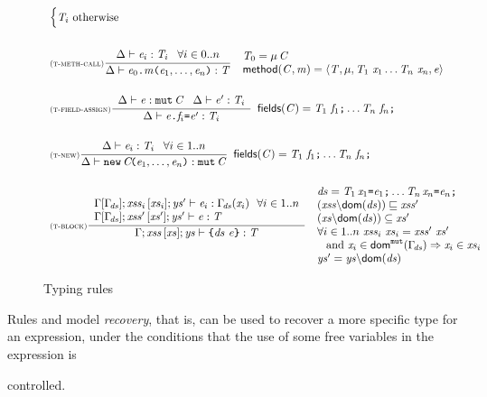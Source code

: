 {\begin{figure}[ht!]
{\begin{footnotesize}
\begin{math}
\begin{array}{l}
{{\begin{cases}
\T_i\ \mbox{otherwise}
\end{cases}
}}
\\[5ex]
\NamedRule{t-meth-call}{\TypeCheckShort{\Delta}{\e_i}{\T_i}\Space\forall i\in 0..n}{\TypeCheckShort{\Delta}{\MethCall{\e_0}{\m}{\e_1,\ldots,\e_n}}{\T}}{
\begin{array}{l}
\T_0=\Type\mu\C\\
\method{\C}{\m}=\FourTuple{\T}{\mu}{\Param{\T_1}{\x_1}\ldots\Param{\T_n}{\x_n}}{\e}
\end{array}
}
\\[5ex]
\NamedRule{t-field-assign}{
  \TypeCheckShort{\Delta}{\e}{\Type{\mutable}{\C}}
  \Space
  \TypeCheckShort{\Delta}{\e'}{\T_i}
  }{
  \TypeCheckShort{\Delta}{\FieldAssign{\e}{\f_i}{\e'}
  }{\T_i}
  }{
  {\fields{\C}=\Field{\T_1}{\f_1}\ldots\Field{\T_n}{\f_n}}
  }
\\[5ex]
\NamedRule{t-new}{\TypeCheckShort{\Delta}{\e_i}{\T_i}\Space\forall i\in 1..n}{\TypeCheckShort{\Delta}{\ConstrCall{\C}{\e_1,\ldots,\e_n}}{\Type{\mutable}{\C}}}{
\fields{\C}=\Field{\T_1}{\f_1}\ldots\Field{\T_n}{\f_n}\\
}
\\[5ex]
{\NamedRule{t-block}{
{\AuxTypeCheck{\SubstFun{\Gamma}{\TypeEnv{\decs}}}{\LentLocked_i}{\MutGroup_i}{\StronglyLocked'}{\e_i}{\TypeEnv{\decs}(\x_i)}\ \ {\forall i\in 1..n}}\\
\AuxTypeCheck{\SubstFun{\Gamma}{\TypeEnv{\decs}}}{\LentLocked'}{{\MutGroup'}}{\StronglyLocked'}{\e}{\T}}
{\AuxTypeCheck{\Gamma}{\LentLocked}{\MutGroup}{\StronglyLocked}{\Block{\decs}{\e}}{\T}}{
\begin{array}{l}
\decs=\Dec{\T_1}{\x_1}{\e_1}\ldots\Dec{\T_n}{\x_n}{\e_n}\\
\LessEq{(\LentLocked{\setminus}\dom{\decs})}{\LentLocked'}\\
(\MutGroup{\setminus}\dom{\decs})\subseteq\MutGroup'\\
\forall i\in 1..n\ \LentLocked_i\ \MutGroup_i = \LentLocked'\ \MutGroup'\\
\Space \mbox{and}\ \x_i\in\domMut{\TypeEnv{\decs}}\Rightarrow\x_i\in \MutGroup_i\\
\StronglyLocked'={\StronglyLocked}{\setminus}{\dom{\decs}}
\end{array}}}
\end{array}
\end{math}
\end{footnotesize}
}
\caption{Typing rules}\label{fig:typing}
\end{figure}
 
Rules  and  
 model \emph{recovery},
 that is, can be used to recover a more specific type for an expression,
 under the conditions that the use of some free variables in the expression is} {controlled}.
